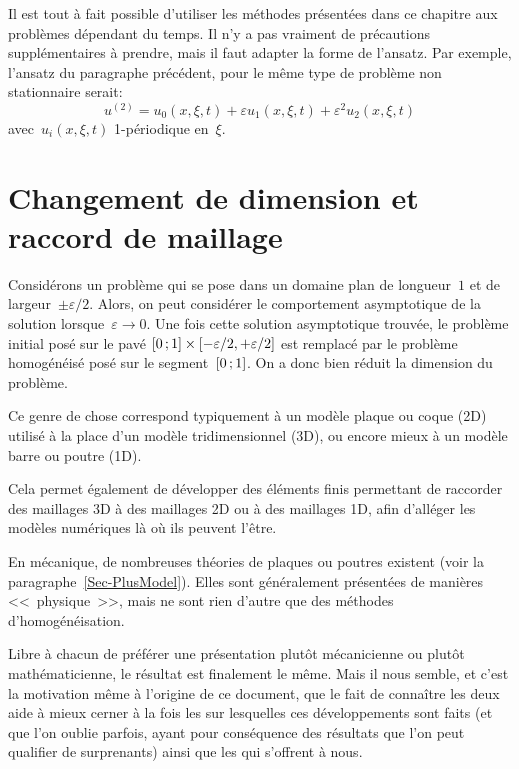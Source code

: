 Il est tout à fait possible d'utiliser les méthodes présentées dans ce chapitre
aux problèmes dépendant du temps.
Il n'y a pas vraiment de précautions supplémentaires à prendre, mais il faut adapter la forme de l'ansatz.
Par exemple, l'ansatz du paragraphe précédent, pour le même type de problème
non stationnaire serait:
\begin{equation}u^{(2)} = u_0(x,\xi,t)+\varepsilon u_1(x,\xi,t) + \varepsilon^2 u_2(x,\xi,t)\end{equation}
avec~$u_i(x,\xi,t)$ 1-périodique en~$\xi$.

\medskip
\section{Changement de dimension et raccord de maillage}

\medskip
Considérons un problème qui se pose dans un domaine plan de longueur~$1$ et de largeur~$\pm\varepsilon/2$.
Alors, on peut considérer le comportement asymptotique de la solution lorsque~$\varepsilon \longrightarrow 0$.
Une fois cette solution asymptotique trouvée, le problème initial posé sur le pavé
$\mathopen{[}0\,;1\mathclose{]}\times[-\varepsilon/2,+\varepsilon/2]$ est remplacé par le problème homogénéisé posé sur le segment~$\mathopen{[}0\,;1\mathclose{]}$. On a donc bien réduit la dimension du problème.

\medskip
Ce genre de chose correspond typiquement à un modèle plaque ou coque (2D) utilisé à la place d'un modèle tridimensionnel (3D), ou encore mieux à un modèle barre ou poutre (1D).

Cela permet également de développer des éléments finis permettant de raccorder des maillages 3D à des maillages 2D ou à des maillages 1D, afin d'alléger les modèles numériques là où ils peuvent l'être.

\medskip
En mécanique, de nombreuses théories de plaques ou poutres existent (voir la paragraphe~\ref{Sec-PlusModel}). Elles sont généralement présentées de manières <<~physique~>>, mais ne sont rien d'autre que des méthodes d'homogénéisation.

Libre à chacun de préférer une présentation plutôt mécanicienne ou plutôt mathématicienne, le résultat est finalement le même. Mais il nous semble, et c'est la motivation même à l'origine de ce document, que le fait de connaître les deux aide à mieux cerner à la fois les  sur lesquelles ces développements sont faits (et que l'on oublie parfois, ayant pour conséquence des résultats que l'on peut qualifier de surprenants) ainsi que les  qui s'offrent à nous. 